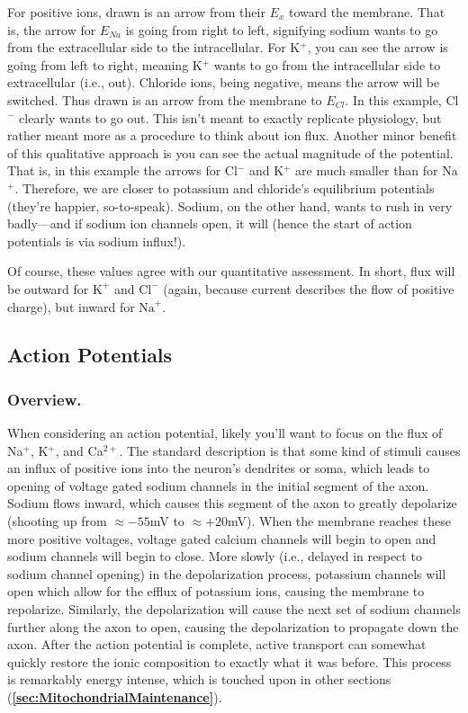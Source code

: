 For positive ions, drawn is an arrow from their $E_x$ toward the membrane. That is, the arrow for $E_{Na}$ is going from right to left, signifying sodium wants to go from the extracellular side to the intracellular. For K$^+$, you can see the arrow is going from left to right, meaning K$^+$ wants to go from the intracellular side to extracellular (i.e., out). Chloride ions, being negative, means the arrow will be switched. Thus drawn is an arrow from the membrane to $E_{Cl}$. In this example, Cl$^-$ clearly wants to go out. This isn't meant to exactly replicate physiology, but rather meant more as a procedure to think about ion flux. Another minor benefit of this qualitative approach is you can see the actual magnitude of the potential. That is, in this example the arrows for Cl$^-$ and K$^+$ are much smaller than for Na$^+$. Therefore, we are closer to potassium and chloride's equilibrium potentials (they're happier, so-to-speak). Sodium, on the other hand, wants to rush in very badly---and if sodium ion channels open, it will (hence the start of action potentials is via sodium influx!). \newline

Of course, these values agree with our quantitative assessment. In short, flux  will be outward for $\mathrm{K}^+$ and $\mathrm{Cl}^-$ (again, because current describes the flow of positive charge), but inward for $\mathrm{Na}^+$.\newline




\subsection{Action Potentials}

\subsubsection{Overview.}

When considering an action potential, likely you'll want to focus on the flux of Na$^+$, K$^+$, and Ca$^{2+}$. The standard description is that some kind of stimuli causes an influx of positive ions into the neuron's dendrites or soma, which leads to opening of voltage gated sodium channels in the initial segment of the axon. Sodium flows inward, which causes this segment of the axon to greatly depolarize (shooting up from $\approx -55$mV to $\approx +20$mV). When the membrane reaches these more positive voltages, voltage gated calcium channels will begin to open and sodium channels will begin to close. More slowly (i.e., delayed in respect to sodium channel opening) in the depolarization process, potassium channels will open which allow for the efflux of potassium ions, causing the membrane to repolarize. Similarly, the depolarization will cause the next set of sodium channels further along the axon to open, causing the depolarization to propagate down the axon. After the action potential is complete, active transport can somewhat quickly restore the ionic composition to exactly what it was before. This process is remarkably energy intense, which is touched upon in other sections (\textbf{\ref{sec:MitochondrialMaintenance}}). 


